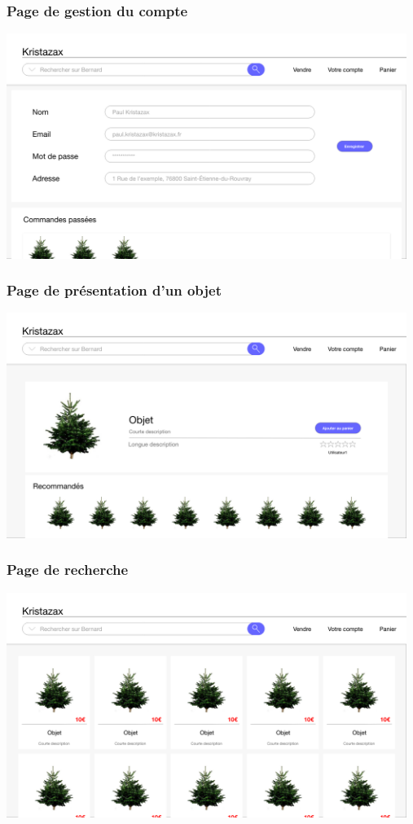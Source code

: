 \subsubsection{Page de gestion du compte}
\includegraphics[width=13cm]{Images/maquette/VotreCompte} \\
\subsubsection{Page de présentation d'un objet}
\includegraphics[width=13cm]{Images/maquette/PageProduit}\\
\subsubsection{Page de recherche}
\includegraphics[width=13cm]{Images/maquette/ResultatRecherche}\\
